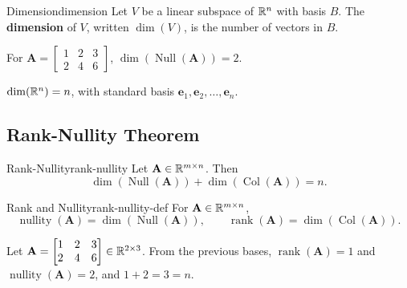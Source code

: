 \begin{definition}{Dimension}{dimension}
  Let $V$ be a linear subspace of $\mathbb{R}^n$ with basis $B$. The \textbf{dimension} of $V$, written $\dim(V)$, is the number of vectors in $B$.
\end{definition}

\begin{example}
  For $\mathbf{A} =
    \begin{bmatrix}
      1 & 2 & 3 \\ 2 & 4 & 6
    \end{bmatrix}
  $, $\dim(\operatorname{Null}(\mathbf{A})) = 2$.
\end{example}

\begin{example}
  $\dim(\mathbb{R}^n) = n$, with standard basis $\mathbf{e}_1, \mathbf{e}_2, \ldots, \mathbf{e}_n$.
\end{example}

\subsection{Rank-Nullity Theorem}

\begin{theorem}{Rank-Nullity}{rank-nullity}
  Let $\mathbf{A} \in \mathbb{R}^{m \times n}$. Then
  \[
    \dim(\operatorname{Null}(\mathbf{A})) + \dim(\operatorname{Col}(\mathbf{A})) = n.
  \]
\end{theorem}

\begin{definition}{Rank and Nullity}{rank-nullity-def}
  For $\mathbf{A} \in \mathbb{R}^{m \times n}$,
  \[
    \operatorname{nullity}(\mathbf{A}) = \dim(\operatorname{Null}(\mathbf{A})),
    \qquad
    \operatorname{rank}(\mathbf{A}) = \dim(\operatorname{Col}(\mathbf{A})).
  \]
\end{definition}

\begin{example}
  Let $\mathbf{A} =
    \begin{bmatrix}
      1 & 2 & 3 \\ 2 & 4 & 6
    \end{bmatrix}
    \in \mathbb{R}^{2 \times 3}$. From the previous bases, $\operatorname{rank}(\mathbf{A}) = 1$ and $\operatorname{nullity}(\mathbf{A}) = 2$, and $1 + 2 = 3 = n$.
\end{example}

